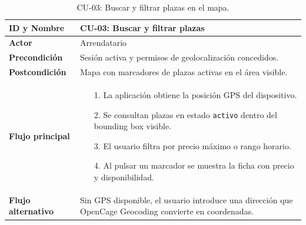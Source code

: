 \begin{table}[htbp]
\centering
\caption{CU-03: Buscar y filtrar plazas en el mapa.}
\label{tab:cu-03}
\begin{tabularx}{\textwidth}{|>{\columncolor{gray!15}\bfseries}l|X|}
\hline
ID y Nombre    & CU-03: Buscar y filtrar plazas \\ \hline
Actor          & Arrendatario \\ \hline
Precondición   & Sesión activa y permisos de geolocalización concedidos. \\ \hline
Postcondición  & Mapa con marcadores de plazas activas en el área visible. \\ \hline
Flujo principal &
\begin{itemize}[leftmargin=3mm, itemsep=0mm, topsep=1mm]
\item[1.] La aplicación obtiene la posición GPS del dispositivo.
\item[2.] Se consultan plazas en estado \texttt{activo} dentro del bounding box visible.
\item[3.] El usuario filtra por precio máximo o rango horario.
\item[4.] Al pulsar un marcador se muestra la ficha con precio y disponibilidad.
\end{itemize} \\ \hline
Flujo alternativo & Sin GPS disponible, el usuario introduce una dirección que OpenCage Geocoding convierte en coordenadas. \\ \hline
\end{tabularx}
\end{table}

